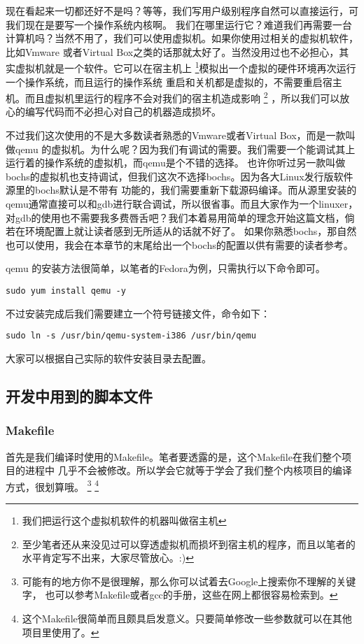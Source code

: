 \par 现在看起来一切都还好不是吗？等等，我们写用户级别程序自然可以直接运行，可我们现在是要写一个操作系统内核啊。\allowbreak
我们在哪里运行它？难道我们再需要一台计算机吗？当然不用了，我们可以使用虚拟机。如果你使用过相关的虚拟机软件，比如Vmware\allowbreak
或者Virtual Box之类的话那就太好了。当然没用过也不必担心，其实虚拟机就是一个软件。它可以在宿主机上\allowbreak
\footnote{我们把运行这个虚拟机软件的机器叫做宿主机}模拟出一个虚拟的硬件环境再次运行一个操作系统，而且运行的操作系统\allowbreak
重启和关机都是虚拟的，不需要重启宿主机。而且虚拟机里运行的程序不会对我们的宿主机造成影响\allowbreak
\footnote{至少笔者还从来没见过可以穿透虚拟机而损坏到宿主机的程序，而且以笔者的水平肯定写不出来，大家尽管放心。:) }
，所以我们可以放心的编写代码而不必担心对自己的机器造成损坏。
\par 不过我们这次使用的不是大多数读者熟悉的Vmware或者Virtual Box，而是一款叫做qemu\allowbreak
的虚拟机。为什么呢？因为我们有调试的需要。我们需要一个能调试其上运行着的操作系统的虚拟机，而qemu是个不错的选择。\allowbreak
也许你听过另一款叫做bochs的虚拟机也支持调试，但我们这次不选择bochs。因为各大Linux发行版软件源里的bochs默认是不带有\allowbreak
功能的，我们需要重新下载源码编译。而从源里安装的qemu通常直接可以和gdb进行联合调试，所以很省事。而且大家作为一个linuxer，\allowbreak
对gdb的使用也不需要我多费唇舌吧？我们本着易用简单的理念开始这篇文档，倘若在环境配置上就让读者感到无所适从的话就不好了。\allowbreak
如果你熟悉bochs，那自然也可以使用，我会在本章节的末尾给出一个bochs的配置以供有需要的读者参考。

qemu 的安装方法很简单，以笔者的Fedora为例，只需执行以下命令即可。
\begin{Verbatim}[frame=single]
    sudo yum install qemu -y
\end{Verbatim}

\par 不过安装完成后我们需要建立一个符号链接文件，命令如下：

\begin{Verbatim}[frame=single]
    sudo ln -s /usr/bin/qemu-system-i386 /usr/bin/qemu
\end{Verbatim}

\par 大家可以根据自己实际的软件安装目录去配置。

\subsection{开发中用到的脚本文件}

\subsubsection{Makefile}
\par 首先是我们编译时使用的Makefile。笔者要透露的是，这个Makefile在我们整个项目的进程中\allowbreak
几乎不会被修改。所以学会它就等于学会了我们整个内核项目的编译方式，很划算哦。
\footnote{可能有的地方你不是很理解，那么你可以试着去Google上搜索你不理解的关键字，\allowbreak
也可以参考Makefile或者gcc的手册，这些在网上都很容易检索到。}
\footnote{这个Makefile很简单而且颇具启发意义。只要简单修改一些参数就可以在其他项目里使用了。}


